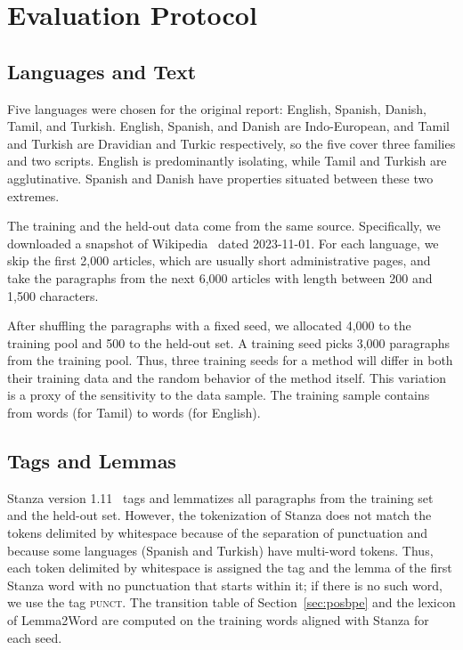 \section{Evaluation Protocol}\label{sec:protocol}

\subsection{Languages and Text}
Five languages were chosen for the original report: English, Spanish, Danish, Tamil, and Turkish.
English, Spanish, and Danish are Indo-European, and Tamil and Turkish are Dravidian and Turkic respectively, so the five cover three families and two scripts.
English is predominantly isolating, while Tamil and Turkish are agglutinative.
Spanish and Danish have properties situated between these two extremes.

The training and the held-out data come from the same source.
Specifically, we downloaded a snapshot of Wikipedia~\cite{wikimedia2023dump} dated 2023-11-01.
For each language, we skip the first 2,000 articles, which are usually short administrative pages, and take the paragraphs from the next 6,000 articles with length between 200 and 1,500 characters.

After shuffling the paragraphs with a fixed seed, we allocated 4,000 to the training pool and 500 to the held-out set.
A training seed picks 3,000 paragraphs from the training pool.
Thus, three training seeds for a method will differ in both their training data and the random behavior of the method itself.
This variation is a proxy of the sensitivity to the data sample.
The training sample contains from \nTrainWordsTamil{} words (for Tamil) to \nTrainWordsEnglish{} words (for English).

\subsection{Tags and Lemmas}
Stanza version 1.11~\cite{qi2020stanza} tags and lemmatizes all paragraphs from the training set and the held-out set.
However, the tokenization of Stanza does not match the tokens delimited by whitespace because of the separation of punctuation and because some languages (Spanish and Turkish) have multi-word tokens.
Thus, each token delimited by whitespace is assigned the tag and the lemma of the first Stanza word with no punctuation that starts within it; if there is no such word, we use the tag \textsc{punct}.
The transition table of Section~\ref{sec:posbpe} and the lexicon of Lemma2Word are computed on the training words aligned with Stanza for each seed.

